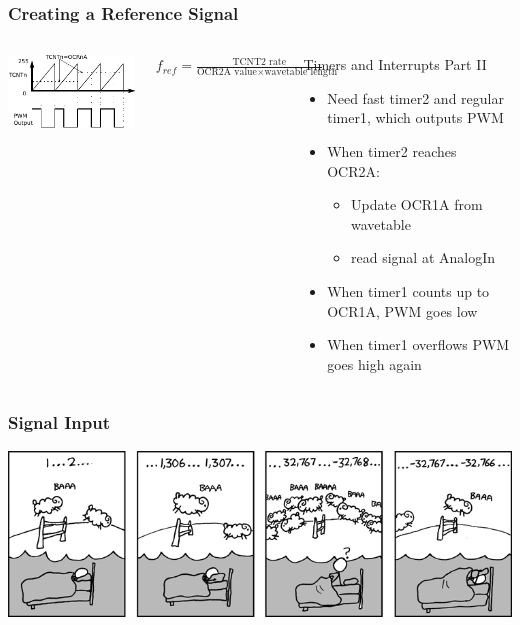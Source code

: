 \documentclass{beamer}
\begin{document}
\begin{frame}
\frametitle{Creating a Reference Signal}
\begin{columns}[T]
	\vspace{.5cm}
	    \includegraphics[scale=1.2]{Bitbang}
	    \vspace{1cm}
	    \begin{block}
	    $f_{ref}=\frac{\text{TCNT2 rate}}{\text{OCR2A value}\times\text{wavetable length}}$
	    \end{block}

	\begin{block}{Timers and Interrupts Part II}
	\begin{itemize}
	\item {Need fast timer2 and regular timer1, which outputs PWM}
	\item{When timer2 reaches OCR2A:}
	\begin{itemize}
        \item {Update OCR1A from wavetable}
        \item{ read signal at AnalogIn}
	\end{itemize}
	\item{When timer1 counts up to OCR1A, PWM goes low}
	\item {When timer1 overflows PWM goes high again}
	
	\end{itemize}
	
	\end{block}
\end{columns}
\end{frame}

\begin{frame}
\frametitle{Signal Input}
\begin{centering}
\includegraphics[scale=.5]{cant_sleep.png}
\end{centering}
\end{frame}
\end{document}
